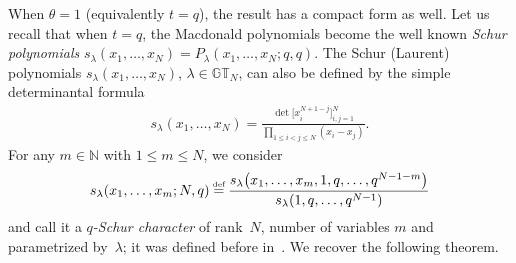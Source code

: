 \documentclass[pdftex]{sigma}
\numberwithin{equation}{section}
\newcommand\myeq{\mathrel{\stackrel{\makebox[0pt]{\mbox{\normalfont\tiny def}}}{=}}}
\newcommand{\N}{\mathbb{N}}
\newcommand{\GT}{\mathbb{GT}}
\begin{document}
When $\theta = 1$ (equivalently $t = q$), the result has a compact form as well. Let us recall that when $t = q$, the Macdonald polynomials become the well known \textit{Schur polynomials} $s_{\lambda}(x_1, \dots, x_N) = P_{\lambda}(x_1, \dots, x_N; q, q)$. The Schur (Laurent) polynomials $s_{\lambda}(x_1, \dots, x_N)$, $\lambda\in\GT_N$, can also be def\/ined by the simple determinantal formula
\begin{gather*}
s_{\lambda}(x_1, \dots, x_N) = \frac{\det\big[x_i^{N+1-j}\big]_{i, j = 1}^N}{\prod\limits_{1\leq i < j \leq N}{(x_i - x_j)}}.
\end{gather*}
For any $m\in\N$ with $1\leq m\leq N$, we consider
\begin{gather*}
s_{\lambda}(x_1, \dots, x_m; N, q) \myeq \frac{s_{\lambda}\big(x_1, \dots, x_m, 1, q, \dots, q^{N-1-m}\big)}{s_{\lambda}(1, q, \dots, q^{N-1})}
\end{gather*}
and call it a \textit{$q$-Schur character} of rank~$N$, number of variables $m$ and parametrized by~$\lambda$; it was def\/ined before in~\cite{G}. We recover the following theorem.
\end{document}
